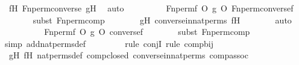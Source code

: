 \begin{isabellebody}
\ fH\ Fn{\isacharunderscore}{\kern0pt}perm{\isacharprime}{\kern0pt}{\isacharunderscore}{\kern0pt}converse\ gH\ \isamarkupfalse%
\ auto\isanewline
\ \ \ \ \isamarkupfalse%
\ \isamarkupfalse%
\ {\isachardoublequoteopen}{\isachardot}{\kern0pt}{\isachardot}{\kern0pt}{\isachardot}{\kern0pt}\ {\isacharequal}{\kern0pt}\ Fn{\isacharunderscore}{\kern0pt}perm{\isacharprime}{\kern0pt}{\isacharparenleft}{\kern0pt}f\ O\ g{\isacharparenright}{\kern0pt}\ O\ Fn{\isacharunderscore}{\kern0pt}perm{\isacharprime}{\kern0pt}{\isacharparenleft}{\kern0pt}converse{\isacharparenleft}{\kern0pt}f{\isacharparenright}{\kern0pt}{\isacharparenright}{\kern0pt}{\isachardoublequoteclose}\ \isanewline
\ \ \ \ \ \ \isamarkupfalse%
{\isacharparenleft}{\kern0pt}subst\ Fn{\isacharunderscore}{\kern0pt}perm{\isacharprime}{\kern0pt}{\isacharunderscore}{\kern0pt}comp{\isacharparenright}{\kern0pt}\isanewline
\ \ \ \ \ \ \isamarkupfalse%
\ gH\ converse{\isacharunderscore}{\kern0pt}in{\isacharunderscore}{\kern0pt}nat{\isacharunderscore}{\kern0pt}perms\ fH\isanewline
\ \ \ \ \ \ \isamarkupfalse%
\ auto\isanewline
\ \ \ \ \isamarkupfalse%
\ \isamarkupfalse%
\ {\isachardoublequoteopen}{\isachardot}{\kern0pt}{\isachardot}{\kern0pt}{\isachardot}{\kern0pt}\ {\isacharequal}{\kern0pt}\ Fn{\isacharunderscore}{\kern0pt}perm{\isacharprime}{\kern0pt}{\isacharparenleft}{\kern0pt}f\ O\ g\ O\ converse{\isacharparenleft}{\kern0pt}f{\isacharparenright}{\kern0pt}{\isacharparenright}{\kern0pt}{\isachardoublequoteclose}\ \isanewline
\ \ \ \ \ \ \isamarkupfalse%
{\isacharparenleft}{\kern0pt}subst\ Fn{\isacharunderscore}{\kern0pt}perm{\isacharprime}{\kern0pt}{\isacharunderscore}{\kern0pt}comp{\isacharparenright}{\kern0pt}\isanewline
\ \ \ \ \ \ \ \ \isamarkupfalse%
{\isacharparenleft}{\kern0pt}simp\ add{\isacharcolon}{\kern0pt}nat{\isacharunderscore}{\kern0pt}perms{\isacharunderscore}{\kern0pt}def{\isacharparenright}{\kern0pt}\isanewline
\ \ \ \ \ \ \ \ \isamarkupfalse%
{\isacharparenleft}{\kern0pt}rule\ conjI{\isacharcomma}{\kern0pt}\ rule\ comp{\isacharunderscore}{\kern0pt}bij{\isacharparenright}{\kern0pt}\isanewline
\ \ \ \ \ \ \isamarkupfalse%
\ gH\ fH\ nat{\isacharunderscore}{\kern0pt}perms{\isacharunderscore}{\kern0pt}def\ comp{\isacharunderscore}{\kern0pt}closed\ converse{\isacharunderscore}{\kern0pt}in{\isacharunderscore}{\kern0pt}nat{\isacharunderscore}{\kern0pt}perms\ comp{\isacharunderscore}{\kern0pt}assoc\isanewline

\end{isabellebody}

